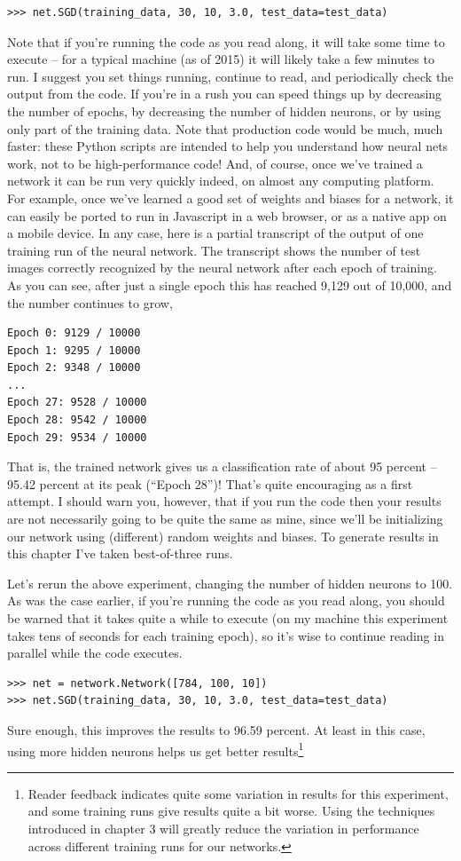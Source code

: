 \documentclass[a4paper,twoside,10pt]{book}
\begin{document}
\begin{lstlisting}
>>> net.SGD(training_data, 30, 10, 3.0, test_data=test_data)
\end{lstlisting}
Note that if you're running the code as you read along, it will take some time to execute -- for a typical machine (as of 2015) it will likely take a few minutes to run. I suggest you set things running, continue to read, and periodically check the output from the code. If you're in a rush you can speed things up by decreasing the number of epochs, by decreasing the number of hidden neurons, or by using only part of the training data. Note that production code would be much, much faster: these Python scripts are intended to help you understand how neural nets work, not to be high-performance code! And, of course, once we've trained a network it can be run very quickly indeed, on almost any computing platform. For example, once we've learned a good set of weights and biases for a network, it can easily be ported to run in Javascript in a web browser, or as a native app on a mobile device. In any case, here is a partial transcript of the output of one training run of the neural network. The transcript shows the number of test images correctly recognized by the neural network after each epoch of training. As you can see, after just a single epoch this has reached 9,129 out of 10,000, and the number continues to grow,
\begin{lstlisting}			
Epoch 0: 9129 / 10000
Epoch 1: 9295 / 10000
Epoch 2: 9348 / 10000
...
Epoch 27: 9528 / 10000
Epoch 28: 9542 / 10000
Epoch 29: 9534 / 10000
\end{lstlisting}
That is, the trained network gives us a classification rate of about 95 percent -- 95.42 percent at its peak (``Epoch 28'')! That's quite encouraging as a first attempt. I should warn you, however, that if you run the code then your results are not necessarily going to be quite the same as mine, since we'll be initializing our network using (different) random weights and biases. To generate results in this chapter I've taken best-of-three runs.

Let's rerun the above experiment, changing the number of hidden neurons to 100. As was the case earlier, if you're running the code as you read along, you should be warned that it takes quite a while to execute (on my machine this experiment takes tens of seconds for each training epoch), so it's wise to continue reading in parallel while the code executes.
\begin{lstlisting}
>>> net = network.Network([784, 100, 10])
>>> net.SGD(training_data, 30, 10, 3.0, test_data=test_data)
\end{lstlisting}
Sure enough, this improves the results to 96.59 percent. At least in this case, using more hidden neurons helps us get better results\footnote{Reader feedback indicates quite some variation in results for this experiment, and some training runs give results quite a bit worse. Using the techniques introduced in chapter 3 will greatly reduce the variation in performance across different training runs for our networks.}
\end{document}
